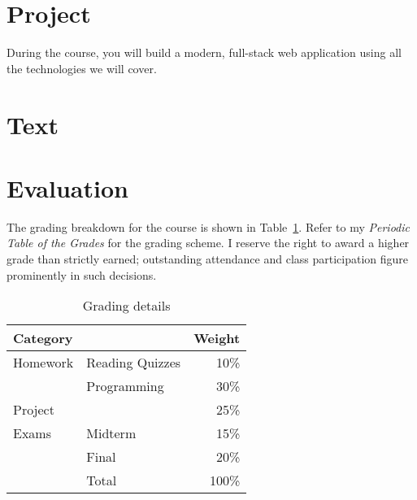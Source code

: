 \documentclass[11pt]{article}
\begin{document}
\section{Project}

During the course,
you will build a modern, full-stack web application
using all the technologies we will cover.

\section{Text}



\section{Evaluation}

The grading breakdown for the course
is shown in Table~\ref{tab:grading}.
Refer to my \emph{Periodic Table of the Grades}
for the grading scheme.
I reserve the right to award a higher grade than strictly earned;
outstanding attendance and class participation
figure prominently in such decisions.

\begin{table}[htb]
  \centering
  \begin{tabular}{llr}
    \toprule
    Category &                 & Weight \\
    \midrule
    Homework & Reading Quizzes & 10\%   \\
             & Programming     & 30\%   \\
    Project  &                 & 25\%   \\
    Exams    & Midterm         & 15\%   \\
             & Final           & 20\%   \\
    \midrule
             & Total           & 100\%  \\
    \bottomrule
  \end{tabular}
  \caption{Grading details}
  \label{tab:grading}
\end{table}
\begin{comment}
#+ORGTBL: SEND grades orgtbl-to-latex :splice nil :skip 0 :booktabs t
| Category |                 | Weight |
|          |                 |    <r> |
|----------+-----------------+--------|
| Homework | Reading Quizzes |    10%
|          | Programming     |    30%
| Project  |                 |    25%
| Exams    | Midterm         |    15%
|          | Final           |    20%
|----------+-----------------+--------|
|          | Total           |   100%
#+TBLFM: @9$3=100*vsum(@I..II);%
\end{comment}



\lastupdated
\end{document}
